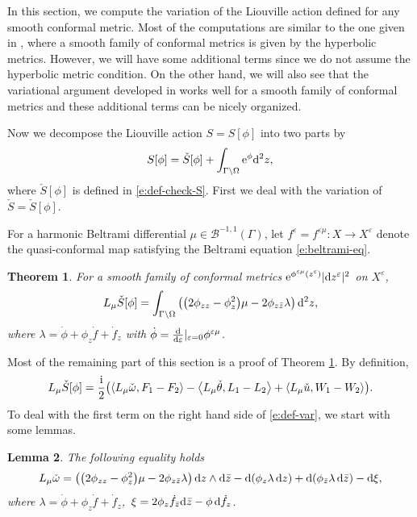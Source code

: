 \documentclass[10pt,a4paper]{amsart}
\numberwithin{equation}{section}
\newtheorem{Theorem}{Theorem}[section]
\newtheorem{Lemma}[Theorem]{Lemma}
\newcommand{\vep}{\varepsilon}
\begin{document}
In this section, we compute the variation of the Liouville action defined for any smooth conformal metric. Most of the computations are similar to the one given in \cite{2}, where a smooth family of conformal metrics is given by the hyperbolic metrics.
However, we will have some additional terms since we do not assume the hyperbolic metric condition.
On the other hand, we will also see that the variational argument developed in \cite{2} works well for a smooth family of conformal metrics and these additional terms can be nicely organized.

Now we decompose the Liouville action $S=S[\phi]$ into two parts by
\begin{gather*}
S[\phi]= \check{S}[\phi] + \int_{\Gamma\backslash \Omega} {\rm e}^{\phi} {\rm d}^2z,
\end{gather*}
where $\check{S}[\phi]$ is defined in \eqref{e:def-check-S}. First we deal with the variation of $\check{S}=\check{S}[\phi]$.

For a harmonic Beltrami differential $\mu\in\mathcal{B}^{-1,1}(\Gamma)$, let $f^{\vep}=f^{\vep\mu}\colon X\to X^{\vep}$ denote the quasi-conformal map satisfying the Beltrami equation \eqref{e:beltrami-eq}.

\begin{Theorem}\label{t:firstvariation}
For a smooth family of conformal metrics ${\rm e}^{\phi^{\vep\mu}(z^\vep)}|{\rm d}z^\vep|^2$ on $X^\vep$,
\begin{gather*}
L_{\mu} \check{S}[\phi]=\int_{\Gamma\backslash \Omega} \big(\big(2\phi_{zz}-\phi^2_z\big)\mu -2\phi_{z\bar{z}} \lambda\big)\, {\rm d}^2z,
\end{gather*}
where $\lambda=\dot{\phi}+\phi_z \dot{f} +\dot{f}_z$ with $\dot{\phi}=\frac{\rm d}{{\rm d}\vep}|_{\vep=0} \phi^{\vep\mu}$.
\end{Theorem}

Most of the remaining part of this section is a proof of Theorem \ref{t:firstvariation}. By definition,
\begin{gather}\label{e:def-var}
L_{\mu}\check{S}[\phi] =\frac{\rm i}{2}\bigl(\langle L_{\mu}\check{\omega}, F_1-F_2 \rangle-\big\langle L_{\mu}\check{\theta}, L_1-L_2 \big\rangle+\langle L_{\mu}\check{u}, W_1-W_2 \rangle\bigr).
\end{gather}
To deal with the first term on the right hand side of \eqref{e:def-var}, we start with some lemmas.
\begin{Lemma}\label{l:1}
The following equality holds
\begin{gather}\label{e:1}
L_{\mu}\check{\omega}
=\big(\big(2\phi_{zz}-\phi^2_z\big)\mu -2\phi_{z\bar{z}} \lambda \big)\, {\rm d}z\wedge {\rm d}\bar{z} -{\rm d}(\phi_z \lambda \,{\rm d}z) +{\rm d}(\phi_{\bar{z}} \lambda\, {\rm d}\bar{z}) -{\rm d}\xi,
\end{gather}
where $\lambda=\dot{\phi}+\phi_z \dot{f} +\dot{f}_z$,\, $\xi=2\phi_z\dot{f}_{\bar{z}}{\rm d}\bar{z}-\phi \,{\rm d}\dot{f}_z$.
\end{Lemma}
\end{document}
